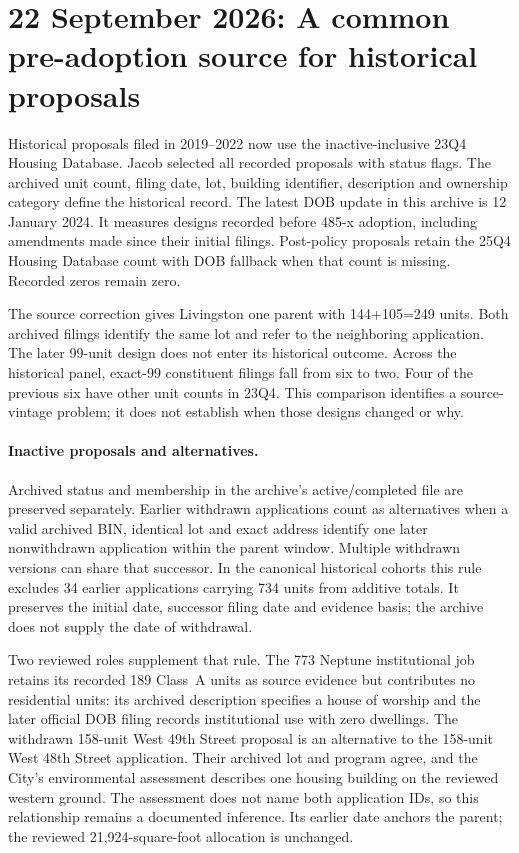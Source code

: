 \section{22 September 2026: A common pre-adoption source for historical proposals}

Historical proposals filed in 2019--2022 now use the inactive-inclusive
23Q4 Housing Database. Jacob selected all recorded proposals with status
flags. The archived unit count, filing date, lot, building identifier,
description and ownership category define the historical record. The latest
DOB update in this archive is 12 January 2024. It measures designs recorded
before 485-x adoption, including amendments made since their initial filings.
Post-policy proposals retain the 25Q4 Housing Database count with DOB fallback
when that count is missing. Recorded zeros remain zero.

The source correction gives Livingston one parent with 144+105=249 units.
Both archived filings identify the same lot and refer to the neighboring
application. The later 99-unit design does not enter its historical outcome.
Across the historical panel, exact-99 constituent filings fall from six to
two. Four of the previous six have other unit counts in 23Q4. This comparison
identifies a source-vintage problem; it does not establish when those designs
changed or why.

\paragraph{Inactive proposals and alternatives.}
Archived status and membership in the archive's active/completed file are
preserved separately. Earlier withdrawn applications count as alternatives
when a valid archived BIN, identical lot and exact address identify one later
nonwithdrawn application within the parent window. Multiple withdrawn
versions can share that successor. In the canonical historical cohorts this
rule excludes 34 earlier applications carrying 734 units from additive totals.
It preserves the initial date, successor filing date and evidence basis;
the archive does not supply the date of withdrawal.

Two reviewed roles supplement that rule. The 773 Neptune institutional job
retains its recorded 189 Class~A units as source evidence but contributes no
residential units: its archived description specifies a house of worship and
the later official DOB filing records institutional use with zero dwellings.
The withdrawn 158-unit West 49th Street proposal is an alternative to the
158-unit West 48th Street application. Their archived lot and program agree,
and the City's environmental assessment describes one housing building on
the reviewed western ground. The assessment does not name both application
IDs, so this relationship remains a documented inference. Its earlier date
anchors the parent; the reviewed 21,924-square-foot allocation is unchanged.

